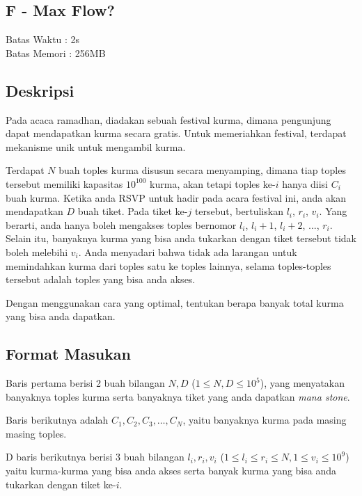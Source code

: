 \documentclass{article}
\begin{document}
\begin{center}
    \section*{F - Max Flow?} %
    Batas Waktu : 2s \\  %
    Batas Memori :  256MB \\ %
\end{center}

\subsection*{Deskripsi}

Pada acaca ramadhan, diadakan sebuah festival kurma, dimana pengunjung dapat mendapatkan kurma secara gratis. Untuk memeriahkan festival, terdapat mekanisme unik untuk mengambil kurma.

Terdapat $N$ buah toples kurma disusun secara menyamping, dimana tiap toples tersebut memiliki kapasitas $10^{100}$ kurma, akan tetapi toples ke-$i$ hanya diisi $C_i$ buah kurma. Ketika anda RSVP untuk hadir pada acara festival ini, anda akan mendapatkan $D$ buah tiket. Pada tiket ke-$j$ tersebut, bertuliskan $l_i$, $r_i$, $v_i$. Yang berarti, anda hanya boleh mengakses toples bernomor $l_i$, $l_i+1$, $l_i+2$, ..., $r_i$. Selain itu, banyaknya kurma yang bisa anda tukarkan dengan tiket tersebut tidak boleh melebihi $v_i$. Anda menyadari bahwa tidak ada larangan untuk memindahkan kurma dari toples satu ke toples lainnya, selama toples-toples tersebut adalah toples yang bisa anda akses. 

Dengan menggunakan cara yang optimal, tentukan berapa banyak total kurma yang bisa anda dapatkan.
\subsection*{Format Masukan}

Baris pertama berisi 2 buah bilangan $N, D$ ($1 \leq N, D \leq 10^5$), yang menyatakan banyaknya toples kurma serta banyaknya tiket yang anda dapatkan \textit{mana stone}. 

Baris berikutnya adalah $C_1, C_2, C_3, \dots, C_N$, yaitu banyaknya kurma pada masing masing toples.

D baris berikutnya berisi 3 buah bilangan $l_i, r_i, v_i$ ($1 \leq l_i \leq r_i \leq N, 1 \leq v_i \leq 10^9$) yaitu kurma-kurma yang bisa anda akses serta banyak kurma yang bisa anda tukarkan dengan tiket ke-$i$.
\end{document}
